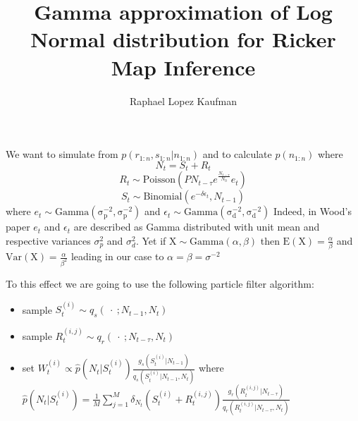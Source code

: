 \documentclass{article}
\title{Gamma approximation of Log Normal distribution for Ricker Map Inference}
\author{Raphael Lopez Kaufman}
\date{}
\begin{document}
	We want to simulate from $p(r_{1:n}, s_{1:n} | n_{1:n})$ and to calculate $p(n_{1:n})$ where
	\begin{equation*}
		N_t = S_t + R_t
	\end{equation*}
	\begin{equation*}
		R_t \sim \mathrm{Poisson}(PN_{t-\tau}e^{\frac{N_{t-\tau}}{N_0}}e_t)
	\end{equation*}
	\begin{equation*}
	S_t \sim \mathrm{Binomial}(e^{-\delta\epsilon_t}, N_{t-1})
	\end{equation*}
	where $e_t \sim \mathrm{Gamma(\sigma_p^{-2}, \sigma_p^{-2})}$ and $\epsilon_t \sim \mathrm{Gamma(\sigma_d^{-2}, \sigma_d^{-2})}$ Indeed, in Wood's paper $e_t$ and $\epsilon_t$ are described as Gamma distributed with unit mean and respective variances $\sigma_p^2$ and $\sigma_d^2$. Yet if $\mathrm{X} \sim \mathrm{Gamma}(\alpha, \beta)$ then $\mathrm{E}(\mathrm{X}) = \frac{\alpha}{\beta}$ and $\mathrm{Var}(\mathrm{X}) = \frac{\alpha}{\beta^2}$ leading in our case to $\alpha=\beta=\sigma^{-2}$
	
	To this effect we are going to use the following particle filter algorithm:
	\begin{itemize}
		\item sample $S_t^{(i)} \sim q_s(\ \cdot \ ; N_{t-1}, N_t)$
		\item sample $R_t^{(i,j)} \sim q_r(\ \cdot \ ; N_{t-\tau}, N_t)$
		\item set $W_t^{(i)} \propto \hat{p}(N_t |S_t^{(i)})\frac{g_s(S_t^{(i)} | N_{t-1})}{q_s(S_t^{(i)} | N_{t-1}, N_t)}$
		where $\hat{p}(N_t |S_t^{(i)}) = \frac{1}{M}\sum_{j=1}^{M}\delta_{N_t}(S_t^{(i)}+R_t^{(i,j)})\frac{g_r(R_t^{(i,j)} | N_{t-\tau})}{q_r( R_t^{(i,j)}| N_{t-\tau}, N_t)}$
	\end{itemize}
	
\end{document}
